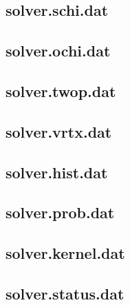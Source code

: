\subsection{solver.schi.dat}
\subsection{solver.ochi.dat}
\subsection{solver.twop.dat}
\subsection{solver.vrtx.dat}
\subsection{solver.hist.dat}
\subsection{solver.prob.dat}
\subsection{solver.kernel.dat}
\subsection{solver.status.dat}
